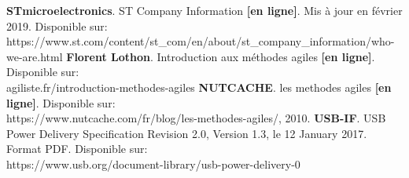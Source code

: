 \adjustmtc
\renewcommand\bibname{BIBLIOGRAPHIE}
\begin{thebibliography}{9}
\thispagestyle{MyStyle}
\textbf{STmicroelectronics}. ST Company Information \textbf{[en ligne]}. Mis à jour en février 2019. Disponible sur:\\ https://www.st.com/content/st\_com/en/about/st\_company\_information/who-we-are.html
\textbf{Florent Lothon}. Introduction aux méthodes agiles \textbf{[en ligne]}. Disponible sur:\\
agiliste.fr/introduction-methodes-agiles
\textbf{NUTCACHE}. les methodes agiles \textbf{[en ligne]}. Disponible sur:\\ https://www.nutcache.com/fr/blog/les-methodes-agiles/, 2010.
\textbf{USB-IF}. USB Power Delivery Specification Revision 2.0, Version 1.3, le 12 January 2017. Format PDF. Disponible sur:\\
https://www.usb.org/document-library/usb-power-delivery-0
\end{thebibliography} 

